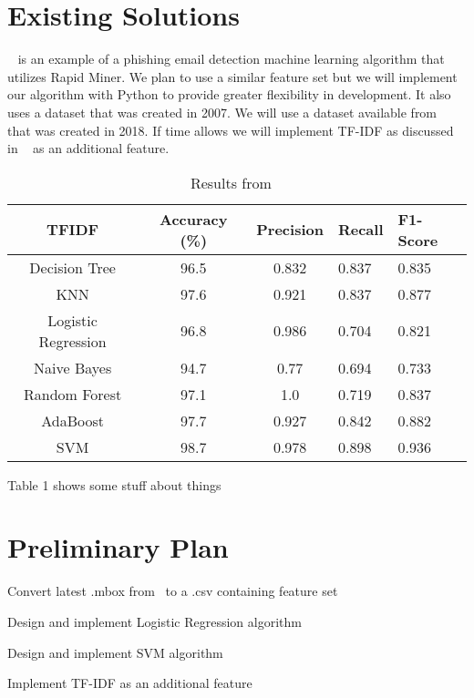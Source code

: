 \documentclass[10pt,twocolumn,letterpaper]{article}
\begin{document}
\section{Existing Solutions}

~\cite{diego} is an example of a phishing email detection machine learning algorithm that utilizes Rapid Miner. We plan to use a similar feature set but we will implement our algorithm with Python to provide greater flexibility in development. It also uses a dataset that was created in 2007. We will use a dataset available from ~\cite{monkey} that was created in 2018. If time allows we will implement TF-IDF as discussed in ~\cite{CENreport} as an additional feature.

\pagebreak

\begin{table}
\begin{center}
\begin{tabular}{|c|c|c|l|l|}
\hline
TFIDF & Accuracy (\%) & Precision & Recall & F1-Score\\
\hline
Decision Tree & 96.5 & 0.832 & 0.837 & 0.835\\
\hline
KNN & 97.6 & 0.921 & 0.837 & 0.877\\
\hline
Logistic Regression & 96.8 & 0.986 & 0.704 & 0.821\\
\hline
Naive Bayes & 94.7 & 0.77 & 0.694 & 0.733\\
\hline
Random Forest& 97.1 & 1.0 & 0.719 & 0.837\\
\hline
AdaBoost & 97.7 & 0.927 & 0.842 & 0.882\\
\hline
SVM & 98.7 & 0.978 & 0.898 & 0.936\\
\hline
\end{tabular}
\end{center}
\caption{Results from ~\cite{CENreport}}
\end{table}

Table 1 shows some stuff about things

\section{Preliminary Plan}

\begin{description}
\item Convert latest .mbox from~\cite{monkey} to a .csv containing feature set
\item Design and implement Logistic Regression algorithm
\item Design and implement SVM algorithm    
\item Implement TF-IDF as an additional feature
\end{description}


{\small


}
\end{document}
